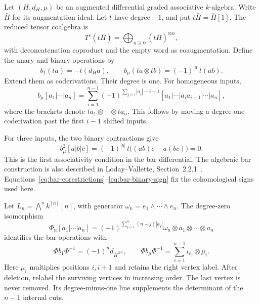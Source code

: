 Let $(H,d_H,\mu)$ be an augmented differential graded associative $k$-algebra.
Write $\bar H$ for its augmentation ideal.
Let $t$ have degree $-1$, and put $t\bar H=\bar H[1]$.
The reduced tensor coalgebra is
\[
T^c(t\bar H)=\bigoplus_{n\geq0}(t\bar H)^{\otimes n},
\]
with deconcatenation coproduct and the empty word as coaugmentation.
Define the unary and binary operations by
\begin{equation}
\label{eq:bar-corestrictions}
b_1(ta)=-t(d_Ha),\qquad
b_\mu(ta\otimes tb)=(-1)^{|a|}t(ab).
\end{equation}
Extend them as coderivations.
Their degree is one.
For homogeneous inputs,
\begin{equation}
\label{eq:bar-binary-sign}
b_\mu[ a_1|\cdots|a_n]
=\sum_{i=1}^{n-1}(-1)^{\sum_{j\leq i}|a_j|-i+1}
 [a_1|\cdots|a_i a_{i+1}|\cdots|a_n],
\end{equation}
where the brackets denote $ta_1\otimes\cdots\otimes ta_n$.
This follows by moving a degree-one coderivation past the first $i-1$ shifted inputs.

For three inputs, the two binary contractions give
\begin{equation}
\label{eq:associative-two-edge}
b_\mu^2[a|b|c]
=(-1)^{|b|}\,t\bigl((ab)c-a(bc)\bigr)=0.
\end{equation}
This is the first associativity condition in the bar differential.
The algebraic bar construction is also described in
Loday--Vallette, Section~2.2.1~\cite{LV12}.
Equations~\eqref{eq:bar-corestrictions}--\eqref{eq:bar-binary-sign} fix the cohomological signs used here.

\begin{proposition}
\label{prop:bar-determinant-comparison}
Let $L_n=\bigwedge^n k^{[n]}[n]$, with generator $\omega_n=e_1\wedge\cdots\wedge e_n$.
The degree-zero isomorphism
\begin{equation}
\label{eq:bar-determinant-map}
\Phi_n[a_1|\cdots|a_n]
=(-1)^{\sum_{j=1}^n(n-j)|a_j|}
 \omega_n\otimes a_1\otimes\cdots\otimes a_n
\end{equation}
identifies the bar operations with
\[
\Phi b_1\Phi^{-1}=(-1)^n d_{\bar H^{\otimes n}},\qquad
\Phi b_\mu\Phi^{-1}=\sum_{i=1}^{n-1}\iota_{e_i}\otimes\mu_i.
\]
Here $\mu_i$ multiplies positions $i,i+1$ and retains the right vertex label.
After deletion, relabel the surviving vertices in increasing order.
The last vertex is never removed.
Its degree-minus-one line supplements the determinant of the $n-1$ internal cuts.
\end{proposition}

